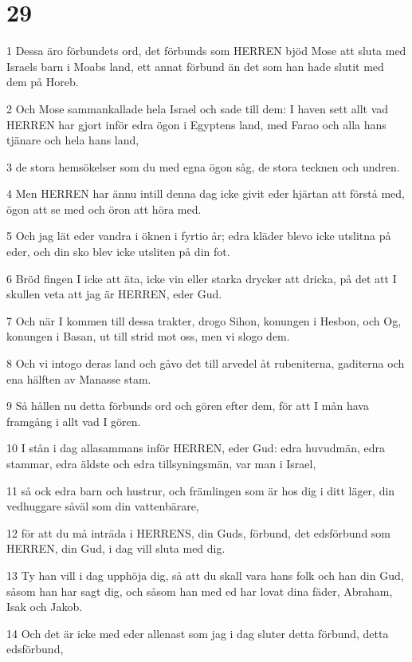 \chapter{29}

\par 1 Dessa äro förbundets ord, det förbunds som HERREN bjöd Mose att sluta med Israels barn i Moabs land, ett annat förbund än det som han hade slutit med dem på Horeb.
\par 2 Och Mose sammankallade hela Israel och sade till dem: I haven sett allt vad HERREN har gjort inför edra ögon i Egyptens land, med Farao och alla hans tjänare och hela hans land,
\par 3 de stora hemsökelser som du med egna ögon såg, de stora tecknen och undren.
\par 4 Men HERREN har ännu intill denna dag icke givit eder hjärtan att förstå med, ögon att se med och öron att höra med.
\par 5 Och jag lät eder vandra i öknen i fyrtio år; edra kläder blevo icke utslitna på eder, och din sko blev icke utsliten på din fot.
\par 6 Bröd fingen I icke att äta, icke vin eller starka drycker att dricka, på det att I skullen veta att jag är HERREN, eder Gud.
\par 7 Och när I kommen till dessa trakter, drogo Sihon, konungen i Hesbon, och Og, konungen i Basan, ut till strid mot oss, men vi slogo dem.
\par 8 Och vi intogo deras land och gåvo det till arvedel åt rubeniterna, gaditerna och ena hälften av Manasse stam.
\par 9 Så hållen nu detta förbunds ord och gören efter dem, för att I mån hava framgång i allt vad I gören.
\par 10 I stån i dag allasammans inför HERREN, eder Gud: edra huvudmän, edra stammar, edra äldste och edra tillsyningsmän, var man i Israel,
\par 11 så ock edra barn och hustrur, och främlingen som är hos dig i ditt läger, din vedhuggare såväl som din vattenbärare,
\par 12 för att du må inträda i HERRENS, din Guds, förbund, det edsförbund som HERREN, din Gud, i dag vill sluta med dig.
\par 13 Ty han vill i dag upphöja dig, så att du skall vara hans folk och han din Gud, såsom han har sagt dig, och såsom han med ed har lovat dina fäder, Abraham, Isak och Jakob.
\par 14 Och det är icke med eder allenast som jag i dag sluter detta förbund, detta edsförbund,
